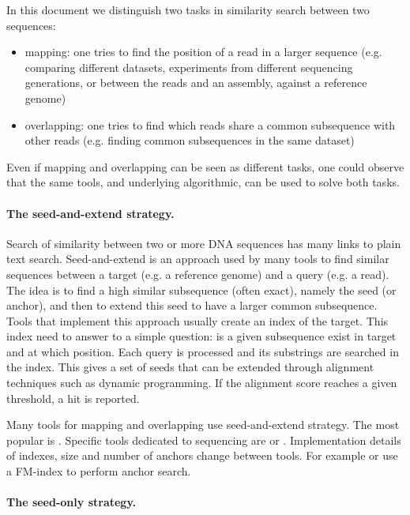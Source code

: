 \documentclass[main.tex]{subfiles}
\begin{document}
In this document we distinguish two tasks in similarity search between two sequences:
\begin{itemize}
    \item mapping: one tries to find the position of a read in a larger sequence (e.g. comparing different datasets, experiments from different sequencing generations, or between the reads and an assembly, against a reference genome)
    \item overlapping: one tries to find which reads share a common subsequence with other reads (e.g. finding common subsequences in the same dataset) 
\end{itemize}
Even if mapping and overlapping can be seen as different tasks, one could observe that the same tools, and underlying algorithmic, can be used to solve both tasks.



\paragraph{The seed-and-extend strategy.} 
Search of similarity between two or more DNA sequences has many links to plain text search.
Seed-and-extend is an approach used by many tools to find similar sequences between a target (e.g. a reference genome) and a query (e.g. a read). The idea is to find a high similar subsequence (often exact), namely the seed (or anchor), and then to extend this seed to have a larger common subsequence. Tools that implement this approach usually create an index of the target. This index need to answer to a simple question: is a given subsequence exist in target and at which position. Each query is processed and its substrings are searched in the index. This gives a set of seeds that can be extended through alignment techniques such as dynamic programming. If the alignment score reaches a given threshold, a hit is reported.

Many tools for mapping and overlapping use seed-and-extend strategy. The most popular is  \cite{blast_one, blast_two}. Specific tools dedicated to sequencing are  \cite{bwa_mem} or  \cite{blasr}. Implementation details of indexes, size and number of anchors change between tools. For example  or  use a FM-index \cite{fm-index} to perform anchor search. 

\paragraph{The seed-only strategy.}
\end{document}
